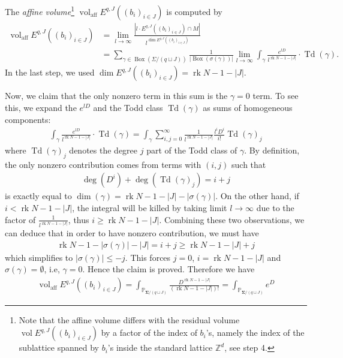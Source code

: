 \documentclass[11pt,reqno]{amsart}
\def\rk {{\operatorname{rk}}}
\def\Z {{\mathbb Z}}
\def\PP {{\mathbb P}}
\theoremstyle{definition}
\numberwithin{equation}{section}
\begin{document}
\smallskip

The {\it affine volume}\footnote{Note that the affine volume differs with the residual volume $\operatorname{vol}E^{q,J}((b_i)_{i\in J})$ by a factor of the index of $b_i$'s, namely the index of the sublattice spanned by $b_i$'s inside the standard lattice $\Z^{d}$, see step 4.} $\operatorname{vol}_{\mathrm{aff}}E^{q,J}((b_i)_{i\in J})$ is computed by
\begin{align*}
	\operatorname{vol}_{\mathrm{aff}}E^{q,J}((b_i)_{i\in J})&=\lim_{l\rightarrow\infty}\frac{|l\cdot E^{q,J}((b_i)_{i\in J})\cap M|}{l^{\dim E^{q,J}((b_i)_{i\in J})}}\\
	&=\sum_{\gamma\in\operatorname{Box}(\Sigma/(q\sqcup J))}\frac{1}{|\operatorname{Box}(\sigma(\gamma))|}\lim_{l\rightarrow\infty}\int_{\gamma}\frac{e^{lD}}{l^{\rk N-1-|J|}}\cdot \operatorname{Td}(\gamma) .
\end{align*}
In the last step, we used $\dim E^{q,J}((b_i)_{i\in J})=\rk N-1-|J|$. 

\smallskip

Now, we claim that the only nonzero term in this sum is the $\gamma=0$ term. To see this, we expand the $e^{lD}$ and the Todd class $\operatorname{Td}(\gamma)$ as sums of homogeneous components:
\begin{align*}
	\int_{\gamma}\frac{e^{lD}}{l^{\rk N-1-|J|}}\cdot \operatorname{Td}(\gamma) = \int_{\gamma}\sum_{i,j=0}^{\infty}\frac{1}{l^{\rk N-1-|J|}}\frac{l^i D^i}{i!}\operatorname{Td}(\gamma)_j
\end{align*}
where $\operatorname{Td}(\gamma)_j$ denotes the degree $j$ part of the Todd class of $\gamma$. By definition, the only nonzero contribution comes from terms with $(i,j)$ such that
\begin{align*}
	\deg(D^i)+\deg(\operatorname{Td}(\gamma)_j)=i+j
\end{align*}
is exactly equal to $\dim(\gamma)=\rk N-1-|J|-|\sigma(\gamma)|$. On the other hand, if $i<\rk N-1-|J|$, the integral will be killed by taking limit $l\rightarrow\infty$ due to the factor of $\frac{1}{l^{\rk N-1-|J|}}$, thus $i\geq \rk N-1-|J|$. Combining these two observations, we can deduce that in order to have nonzero contribution, we must have
\begin{align*}
	\rk N-1-|\sigma(\gamma)|-|J|=i+j\geq \rk N-1-|J|+j
\end{align*}
which simplifies to $|\sigma(\gamma)|\leq -j$. This forces $j=0$, $i=\rk N-1-|J|$ and $\sigma(\gamma)=\emptyset$, i.e, $\gamma=0$. Hence the claim is proved.
Therefore we have
\begin{align*}
	\operatorname{vol}_{\mathrm{aff}}E^{q,J}((b_i)_{i\in J})=\int_{\PP_{\mathbf{\Sigma}/(q\sqcup J)}}\frac{D^{\rk N-1-|J|}}{(\rk N-1-|J|)!}=\int_{\PP_{\mathbf{\Sigma}/(q\sqcup J)}}e^{D}
\end{align*}
\end{document}
